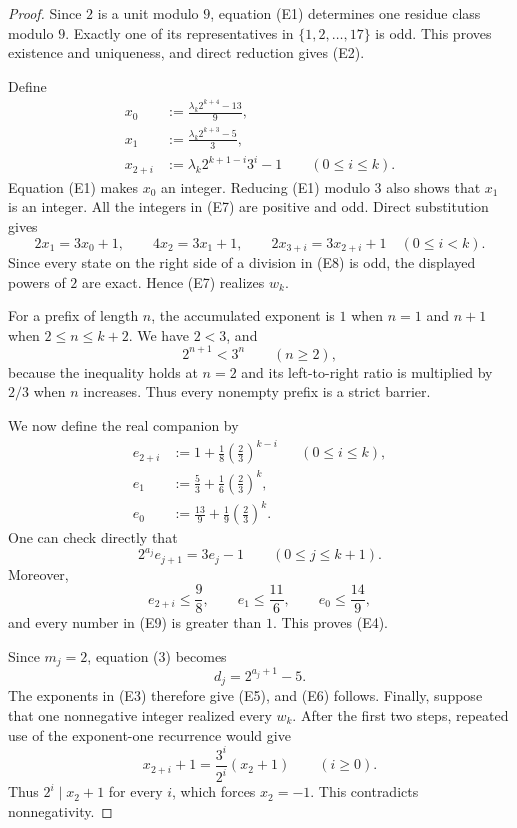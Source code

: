 \documentclass[11pt]{article}
\begin{document}
\begin{proof}
Since $2$ is a unit modulo $9$, equation (E1) determines one residue class
modulo $9$.  Exactly one of its representatives in $\{1,2,\ldots,17\}$ is
odd.  This proves existence and uniqueness, and direct reduction gives
(E2).

Define
\[
\begin{aligned}
  x_0&:=\frac{\lambda_k2^{k+4}-13}{9},\\
  x_1&:=\frac{\lambda_k2^{k+3}-5}{3},\\
  x_{2+i}&:=\lambda_k2^{k+1-i}3^i-1
  \qquad(0\leq i\leq k).
\end{aligned}
\tag{E7}
\]
Equation (E1) makes $x_0$ an integer.  Reducing (E1) modulo $3$ also
shows that $x_1$ is an integer.  All the integers in (E7) are positive and
odd.  Direct substitution gives
\[
  2x_1=3x_0+1,
  \qquad
  4x_2=3x_1+1,
  \qquad
  2x_{3+i}=3x_{2+i}+1
  \quad(0\leq i<k).
  \tag{E8}
\]
Since every state on the right side of a division in (E8) is odd, the
displayed powers of $2$ are exact.  Hence (E7) realizes $w_k$.

For a prefix of length $n$, the accumulated exponent is $1$ when $n=1$
and $n+1$ when $2\leq n\leq k+2$.  We have $2<3$, and
\[
  2^{n+1}<3^n
  \qquad(n\geq2),
\]
because the inequality holds at $n=2$ and its left-to-right ratio is
multiplied by $2/3$ when $n$ increases.  Thus every nonempty prefix is a
strict barrier.

We now define the real companion by
\[
\begin{aligned}
  e_{2+i}&:=1+\frac18\left(\frac23\right)^{k-i}
  &&(0\leq i\leq k),\\
  e_1&:=\frac53+\frac16\left(\frac23\right)^k,\\
  e_0&:=\frac{13}{9}+\frac19\left(\frac23\right)^k.
\end{aligned}
\tag{E9}
\]
One can check directly that
\[
  2^{a_j}e_{j+1}=3e_j-1
  \qquad(0\leq j\leq k+1).
\]
Moreover,
\[
  e_{2+i}\leq\frac98,
  \qquad
  e_1\leq\frac{11}{6},
  \qquad
  e_0\leq\frac{14}{9},
\]
and every number in (E9) is greater than $1$.  This proves (E4).

Since $m_j=2$, equation (3) becomes
\[
  d_j=2^{a_j+1}-5.
\]
The exponents in (E3) therefore give (E5), and (E6) follows.  Finally,
suppose that one nonnegative integer realized every $w_k$.  After the
first two steps, repeated use of the exponent-one recurrence would give
\[
  x_{2+i}+1=\frac{3^i}{2^i}(x_2+1)
  \qquad(i\geq0).
\]
Thus $2^i\mid x_2+1$ for every $i$, which forces $x_2=-1$.  This
contradicts nonnegativity.
\end{proof}
\end{document}
